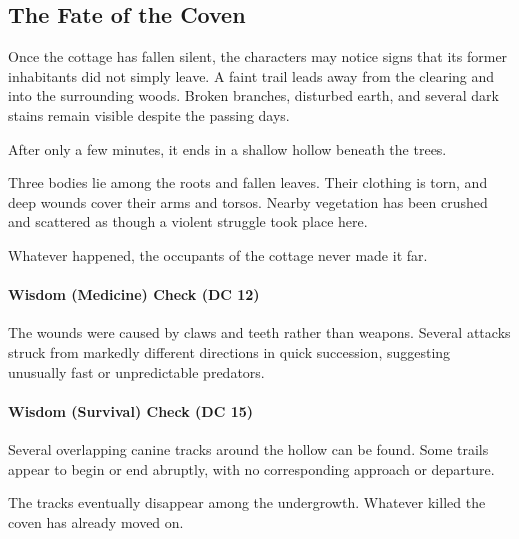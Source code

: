 \subsection*{The Fate of the Coven}
{\entryfont Once the cottage has fallen silent, the characters may notice signs that its former inhabitants did not simply leave. A faint trail leads away from the clearing and into the surrounding woods. Broken branches, disturbed earth, and several dark stains remain visible despite the passing days.

After only a few minutes, it ends in a shallow hollow beneath the trees.}
\begin{DndReadAloud}
	Three bodies lie among the roots and fallen leaves. Their clothing is torn, and deep wounds cover their arms and torsos. Nearby vegetation has been crushed and scattered as though a violent struggle took place here.

	Whatever happened, the occupants of the cottage never made it far.
\end{DndReadAloud}
{\entryfont \paragraph*{Wisdom (Medicine) Check (DC 12)} The wounds were caused by claws and teeth rather than weapons. Several attacks struck from markedly different directions in quick succession, suggesting unusually fast or unpredictable predators.\\
\paragraph*{Wisdom (Survival) Check (DC 15)} Several overlapping canine tracks around the hollow can be found. Some trails appear to begin or end abruptly, with no corresponding approach or departure.}
\begin{DndReadAloud}
	The tracks eventually disappear among the undergrowth. Whatever killed the coven has already moved on.
\end{DndReadAloud}
